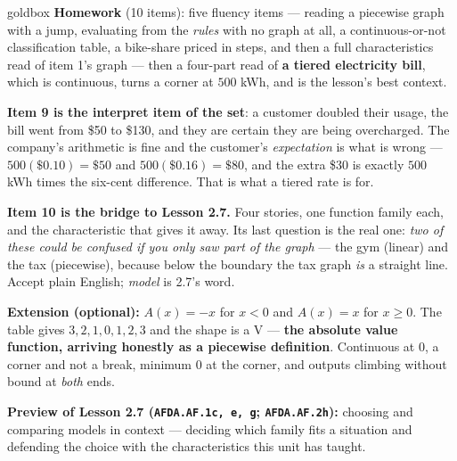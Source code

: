 \documentclass[10pt]{article}
\begin{document}
\boxguard[18]
\begin{skillbox}{goldbox}
\textbf{Homework} (10 items): five fluency items --- reading a piecewise graph with a jump, evaluating
from the \emph{rules} with no graph at all, a continuous-or-not classification table, a bike-share
priced in steps, and then a full characteristics read of item 1's graph --- then a four-part read of
\textbf{a tiered electricity bill}, which is continuous, turns a corner at $500$ kWh, and is the
lesson's best context.

\textbf{Item 9 is the interpret item of the set}: a customer doubled their usage, the bill went from
\$50 to \$130, and they are certain they are being overcharged. The company's arithmetic is fine and
the customer's \emph{expectation} is what is wrong --- $500(\$0.10)=\$50$ and $500(\$0.16)=\$80$, and
the extra \$30 is exactly $500$ kWh times the six-cent difference. That is what a tiered rate is for.

\textbf{Item 10 is the bridge to Lesson 2.7.} Four stories, one function family each, and the
characteristic that gives it away. Its last question is the real one: \emph{two of these could be
confused if you only saw part of the graph} --- the gym (linear) and the tax (piecewise), because
below the boundary the tax graph \emph{is} a straight line. Accept plain English; \emph{model} is
2.7's word.

\textbf{Extension (optional):} $A(x)=-x$ for $x<0$ and $A(x)=x$ for $x \ge 0$. The table gives $3, 2,
1, 0, 1, 2, 3$ and the shape is a V --- \textbf{the absolute value function, arriving honestly as a
piecewise definition}. Continuous at $0$, a corner and not a break, minimum $0$ at the corner, and
outputs climbing without bound at \emph{both} ends.

\textbf{Preview of Lesson 2.7 (\texttt{AFDA.AF.1c, e, g}; \texttt{AFDA.AF.2h}):} choosing and comparing
models in context --- deciding which family fits a situation and defending the choice with the
characteristics this unit has taught.
\end{skillbox}
\end{document}
